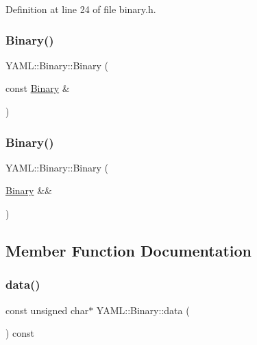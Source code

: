 Definition at line 24 of file binary.\+h.

\mbox{\label{class_y_a_m_l_1_1_binary_a404eefb26378bd8c98f04510b317ffd0}} 
\subsubsection{\texorpdfstring{Binary()}{Binary()}\hspace{0.1cm}{\footnotesize\ttfamily [3/4]}}
{\footnotesize\ttfamily Y\+A\+M\+L\+::\+Binary\+::\+Binary (\begin{DoxyParamCaption}\item[{const \mbox{\hyperlink{class_y_a_m_l_1_1_binary}{Binary}} \&}]{ }\end{DoxyParamCaption})\hspace{0.3cm}{\ttfamily [default]}}

\mbox{\label{class_y_a_m_l_1_1_binary_afacd9fcc0b29ce503fcd421a1fb9759f}} 
\subsubsection{\texorpdfstring{Binary()}{Binary()}\hspace{0.1cm}{\footnotesize\ttfamily [4/4]}}
{\footnotesize\ttfamily Y\+A\+M\+L\+::\+Binary\+::\+Binary (\begin{DoxyParamCaption}\item[{\mbox{\hyperlink{class_y_a_m_l_1_1_binary}{Binary}} \&\&}]{ }\end{DoxyParamCaption})\hspace{0.3cm}{\ttfamily [default]}}



\subsection{Member Function Documentation}
\mbox{\label{class_y_a_m_l_1_1_binary_a3820519141e9c590937dace0a3e34d5f}} 
\subsubsection{\texorpdfstring{data()}{data()}}
{\footnotesize\ttfamily const unsigned char$\ast$ Y\+A\+M\+L\+::\+Binary\+::data (\begin{DoxyParamCaption}{ }\end{DoxyParamCaption}) const\hspace{0.3cm}{\ttfamily [inline]}}




